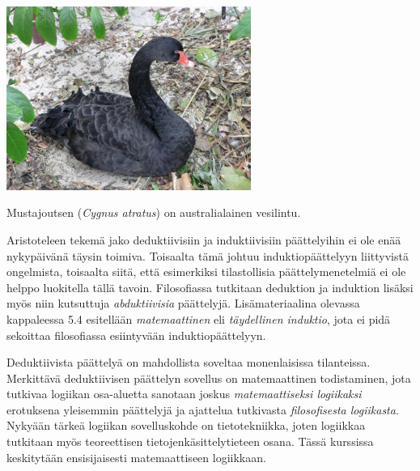 \bigskip

\begin{center}
\includegraphics[width=8cm]{pictures/kuvitus/Cygnus_atratus1}

Mustajoutsen ({\it Cygnus atratus}) on australialainen vesilintu.
\end{center}

\bigskip

Aristoteleen tekemä jako deduktiivisiin ja induktiivisiin päättelyihin ei ole enää nykypäivänä täysin toimiva. Toisaalta tämä johtuu induktiopäättelyyn liittyvistä ongelmista, toisaalta siitä, että esimerkiksi tilastollisia päättelymenetelmiä ei ole helppo luokitella tällä tavoin. Filosofiassa tutkitaan deduktion ja induktion lisäksi myös niin kutsuttuja \emph{abduktiivisia} päättelyjä. Lisämateriaalina olevassa kappaleessa 5.4 esitellään \emph{matemaattinen} eli \emph{täydellinen induktio}, jota ei pidä sekoittaa filosofiassa esiintyvään induktiopäättelyyn.

Deduktiivista päättelyä on mahdollista soveltaa monenlaisissa tilanteissa. Merkittävä deduktiivisen päättelyn sovellus on matemaattinen todistaminen, jota tutkivaa logiikan osa-aluetta sanotaan joskus \emph{matemaattiseksi logiikaksi} erotuksena yleisemmin päättelyjä ja ajattelua tutkivasta \emph{filosofisesta logiikasta}. Nykyään tärkeä logiikan sovelluskohde on tietotekniikka, joten logiikkaa tutkitaan myös teoreettisen tietojen\-käsittely\-tieteen osana. Tässä kurssissa keskitytään ensisijaisesti matemaattiseen logiikkaan.

